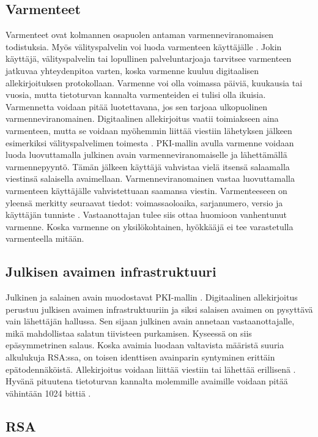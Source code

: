 \documentclass[finnish]{tktltiki2}
\theoremstyle{definition}
\theoremstyle{remark}
\begin{document}
\subsection{Varmenteet}

Varmenteet ovat kolmannen osapuolen antaman varmenneviranomaisen todistuksia. Myös välityspalvelin voi luoda varmenteen käyttäjälle \cite{proxy}. Jokin käyttäjä, välityspalvelin tai lopullinen palveluntarjoaja tarvitsee varmenteen jatkuvaa yhteydenpitoa varten, koska varmenne kuuluu digitaalisen allekirjoituksen protokollaan. Varmenne voi olla voimassa päiviä, kuukausia tai vuosia, mutta tietoturvan kannalta varmenteiden ei tulisi olla ikuisia. Varmennetta voidaan pitää luotettavana, jos sen tarjoaa ulkopuolinen varmenneviranomainen. Digitaalinen allekirjoitus vaatii toimiakseen aina varmenteen, mutta se voidaan myöhemmin liittää viestiin lähetyksen jälkeen esimerkiksi välityspalvelimen toimesta \cite{proxy}. PKI-mallin avulla varmenne voidaan luoda luovuttamalla julkinen avain varmenneviranomaiselle ja lähettämällä varmennepyyntö. Tämän jälkeen käyttäjä vahvistaa vielä itsensä salaamalla viestinsä salaisella avaimellaan. Varmenneviranomainen vastaa luovuttamalla varmenteen käyttäjälle vahvistettuaan saamansa viestin. Varmenteeseen on yleensä merkitty seuraavat tiedot: voimassaoloaika, sarjanumero, versio ja käyttäjän tunniste \cite{ECC}. Vastaanottajan tulee siis ottaa huomioon vanhentunut varmenne. Koska varmenne on yksilökohtainen, hyökkääjä ei tee varastetulla varmenteella mitään.


\subsection{Julkisen avaimen infrastruktuuri}

Julkinen ja salainen avain muodostavat PKI-mallin \cite{ECC}. Digitaalinen allekirjoitus perustuu julkisen avaimen infrastruktuuriin ja siksi salaisen avaimen on pysyttävä vain lähettäjän hallussa. Sen sijaan julkinen avain annetaan vastaanottajalle, mikä mahdollistaa salatun tiivisteen purkamisen. Kyseessä on siis epäsymmetrinen salaus. Koska avaimia luodaan valtavista määristä suuria alkulukuja RSA:ssa, on toisen identtisen avainparin syntyminen erittäin epätodennäköistä. Allekirjoitus voidaan liittää viestiin tai lähettää erillisenä \cite{moen}. Hyvänä pituutena tietoturvan kannalta molemmille avaimille voidaan pitää vähintään 1024 bittiä \cite{ECC}. 

\subsection{RSA}
\end{document}
